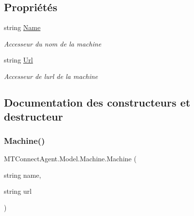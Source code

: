 \subsection*{Propriétés}
\begin{DoxyCompactItemize}
\item 
string \mbox{\hyperlink{class_m_t_connect_agent_1_1_model_1_1_machine_aa70c7db4903ee28733408db9d6a2bd4a}{Name}}
\begin{DoxyCompactList}\small\item\em Accesseur du nom de la machine \end{DoxyCompactList}\item 
string \mbox{\hyperlink{class_m_t_connect_agent_1_1_model_1_1_machine_ad31a7be0d27dbfeb749bbf6874546a30}{Url}}
\begin{DoxyCompactList}\small\item\em Accesseur de l\textquotesingle{}url de la machine \end{DoxyCompactList}\end{DoxyCompactItemize}


\subsection{Documentation des constructeurs et destructeur}
\mbox{\label{class_m_t_connect_agent_1_1_model_1_1_machine_a2fd689b697c2297a488219ac15765d1b}} 
\subsubsection{\texorpdfstring{Machine()}{Machine()}}
{\footnotesize\ttfamily M\+T\+Connect\+Agent.\+Model.\+Machine.\+Machine (\begin{DoxyParamCaption}\item[{string}]{name,  }\item[{string}]{url }\end{DoxyParamCaption})\hspace{0.3cm}{\ttfamily [inline]}}






